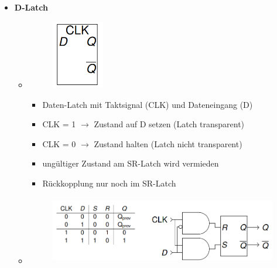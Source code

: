 \documentclass[11pt,a4paper]{article}
\begin{document}
\begin{itemize}
\item \textbf{D-Latch}
	\begin{itemize}
	\item[]		
				\begin{minipage}{0.25\textwidth}
					\begin{figure}[H]
					\includegraphics[height=3cm]{Bilder/dlatch1}
					\end{figure}
				\end{minipage}
				\begin{minipage}[t]{0.6\textwidth}
					\vspace{-1.25cm}
					\begin{itemize}
					\item Daten-Latch mit Taktsignal (CLK) und Dateneingang (D)
					\item CLK = 1 $\rightarrow$ Zustand auf D setzen (Latch transparent)
					\item CLK = 0 $\rightarrow$ Zustand halten (Latch nicht transparent)
					\item ungültiger Zustand am SR-Latch wird vermieden
					\item Rückkopplung nur noch im SR-Latch
					\end{itemize}
				\end{minipage}
				
	\item[] \begin{figure}[H]
				\begin{center}
				\includegraphics[height=3cm]{Bilder/dlatch2}
				\end{center}
			\end{figure}
	 

\end{itemize}
\end{itemize}
\end{document}
